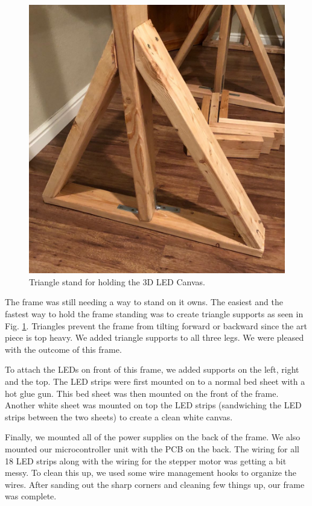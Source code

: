 \documentclass[11pt]{IEEEtran}
\begin{document}
\begin{figure}
  \centering
  \includegraphics[width=\columnwidth]{image5.png}
  \caption{Triangle stand for holding the 3D LED Canvas.}
  \label{fig:framelegs}
\end{figure}

The frame was still needing a way to stand on it owns. The easiest and the fastest way to hold the frame standing was to create triangle supports as seen in Fig. \ref{fig:framelegs}. Triangles prevent the frame from tilting forward or backward since the art piece is top heavy. We added triangle supports to all three legs. We were pleased with the outcome of this frame.

To attach the LEDs on front of this frame, we added supports on the left, right and the top. The LED strips were first mounted on to a normal bed sheet with a hot glue gun. This bed sheet was then mounted on the front of the frame. Another white sheet was mounted on top the LED strips (sandwiching the LED strips between the two sheets) to create a clean white canvas.

Finally, we mounted all of the power supplies on the back of the frame. We also mounted our microcontroller unit with the PCB on the back. The wiring for all 18 LED strips along with the wiring for the stepper motor was getting a bit messy. To clean this up, we used some wire management hooks to organize the wires. After sanding out the sharp corners and cleaning few things up, our frame was complete.
\end{document}

